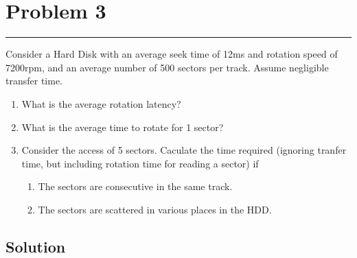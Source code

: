 \documentclass{article}
\begin{document}
\section*{Problem 3}
\hrule
\vspace{0.5cm}

Consider a Hard Disk with an average seek time of 12ms and rotation speed of 7200rpm, and an average number of 500 sectors per track. Assume negligible transfer time.
\begin{enumerate}[label=(\alph*)]
    \item What is the average rotation latency?
    \item What is the average time to rotate for 1 sector?
    \item Consider the access of 5 sectors. Caculate the time required (ignoring tranfer time, but including rotation time for reading a sector) if
          \begin{enumerate}[label=(\roman*)]
              \item The sectors are consecutive in the same track.
              \item The sectors are scattered in various places in the HDD.
          \end{enumerate}
\end{enumerate}

\subsection*{Solution}
\end{document}

